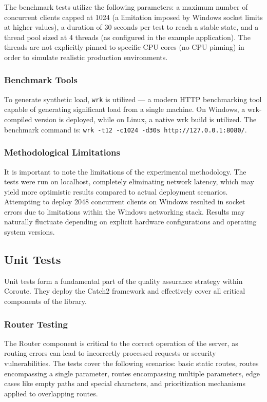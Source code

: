 The benchmark tests utilize the following parameters: a maximum number of concurrent clients capped at 1024 (a limitation imposed by Windows socket limits at higher values), a duration of 30 seconds per test to reach a stable state, and a thread pool sized at 4 threads (as configured in the example application). The threads are not explicitly pinned to specific CPU cores (no CPU pinning) in order to simulate realistic production environments.

\subsubsection{Benchmark Tools}

To generate synthetic load, \texttt{wrk} \cite{wrk} is utilized --- a modern HTTP benchmarking tool capable of generating significant load from a single machine. On Windows, a wrk-compiled version is deployed, while on Linux, a native wrk build is utilized. The benchmark command is: \texttt{wrk -t12 -c1024 -d30s http://127.0.0.1:8080/}.

\subsubsection{Methodological Limitations}

It is important to note the limitations of the experimental methodology. The tests were run on localhost, completely eliminating network latency, which may yield more optimistic results compared to actual deployment scenarios. Attempting to deploy 2048 concurrent clients on Windows resulted in socket errors due to limitations within the Windows networking stack. Results may naturally fluctuate depending on explicit hardware configurations and operating system versions.

\subsection{Unit Tests}

Unit tests form a fundamental part of the quality assurance strategy within Coroute. They deploy the Catch2 framework \cite{catch2} and effectively cover all critical components of the library.

\subsubsection{Router Testing}

The Router component is critical to the correct operation of the server, as routing errors can lead to incorrectly processed requests or security vulnerabilities. The tests cover the following scenarios: basic static routes, routes encompassing a single parameter, routes encompassing multiple parameters, edge cases like empty paths and special characters, and prioritization mechanisms applied to overlapping routes.

